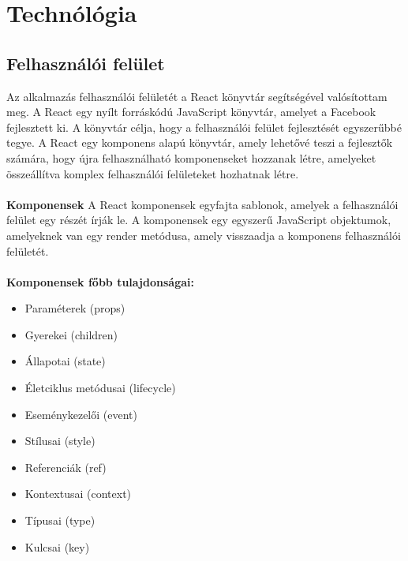 \chapter{Techn\'ol\'ogia}\label{chapter:technologia}
\section{Felhasználói felület }
Az alkalmazás felhasználói felületét a React könyvtár segítségével valósítottam meg.
A React egy nyílt forráskódú JavaScript könyvtár, amelyet a Facebook fejlesztett ki.
A könyvtár célja, hogy a felhasználói felület fejlesztését egyszerűbbé tegye.
A React egy komponens alapú könyvtár, amely lehetővé teszi a fejlesztők számára,
hogy újra felhasználható komponenseket hozzanak létre, amelyeket összeállítva
komplex felhasználói felületeket hozhatnak létre.
\\
\\
\textbf{Komponensek}
A React komponensek egyfajta sablonok, amelyek a felhasználói felület egy részét írják le.
A komponensek egy egyszerű JavaScript objektumok, amelyeknek van egy render metódusa,
amely visszaadja a komponens felhasználói felületét.
\\
\\
\textbf{Komponensek főbb tulajdonságai:}
\begin{itemize}
    \item Paraméterek (props)
    \item Gyerekei (children)
    \item Állapotai (state)
    \item Életciklus metódusai (lifecycle)
    \item Eseménykezelői (event)
    \item Stílusai (style)
    \item Referenciák (ref)
    \item Kontextusai (context)
    \item Típusai (type)
    \item Kulcsai (key)
\end{itemize}
